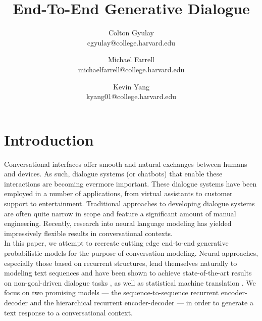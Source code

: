 \documentclass[11pt]{article}
\title{End-To-End Generative Dialogue}
\author{Colton Gyulay \\ cgyulay@college.harvard.edu \and Michael Farrell \\ michaelfarrell@college.harvard.edu \and Kevin Yang \\ kyang01@college.harvard.edu }
\begin{document}
\maketitle{}



\section{Introduction}

Conversational interfaces offer smooth and natural exchanges between humans and devices. As such, dialogue systems (or chatbots) that enable these interactions are becoming evermore important. These dialogue systems have been employed in a number of applications, from virtual assistants to customer support to entertainment. Traditional approaches to developing dialogue systems are often quite narrow in scope and feature a significant amount of manual engineering. Recently, research into neural language modeling has yielded impressively flexible results in conversational contexts.\\

\noindent In this paper, we attempt to recreate cutting edge end-to-end generative probabilistic models for the purpose of conversation modeling. Neural approaches, especially those based on recurrent structures, lend themselves naturally to modeling text sequences and have been shown to achieve state-of-the-art results on non-goal-driven dialogue tasks \cite{vinyals, serban}, as well as statistical machine translation \cite{sutskever, cho}. We focus on two promising models --- the sequence-to-sequence recurrent encoder-decoder and the hierarchical recurrent encoder-decoder --- in order to generate a text response to a conversational context. \\
\end{document}
